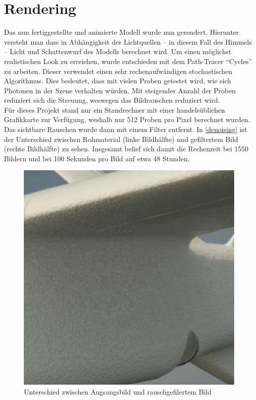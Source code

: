 \section{Rendering}
\label{sec:rendering}

Das nun fertiggestellte und animierte Modell wurde nun gerendert. Hierunter versteht man dass in Abhängigkeit der Lichtquellen -- in diesem Fall des Himmels -- Licht und Schattenwurf des Modells berechnet wird. Um einen möglichst realistischen Look zu erreichen, wurde entschieden mit dem Path-Tracer ``Cycles'' zu arbeiten. Dieser verwendet einen sehr rechenaufwändigen stochastischen Algorithmus. Dies bedeutet, dass mit vielen Proben getestet wird, wie sich Photonen in der Szene verhalten würden. Mit steigender Anzahl der Proben reduziert sich die Streuung, weswegen das Bildrauschen reduziert wird. \\
Für dieses Projekt stand nur ein Standrechner mit einer handelsüblichen Grafikkarte zur Verfügung, weshalb nur 512 Proben pro Pixel berechnet wurden. Das sichtbare Rauschen wurde dann mit einem Filter entfernt. In \autoref{denoising} ist der Unterschied zwischen Rohmaterial (linke Bildhälfte) und gefiltertem Bild (rechte Bildhälfte) zu sehen. Insgesamt belief sich damit die Rechenzeit bei 1550 Bildern und bei 100 Sekunden pro Bild auf etwa 48 Stunden.

\begin{figure}[H]
\begin{center}
\includegraphics[width=\textwidth]{gfx/post/denoising.jpg}
\caption{Unterschied zwischen Augsangsbild und rauschgefilertem Bild}
\label{denoising}
\end{center}
\end{figure}

